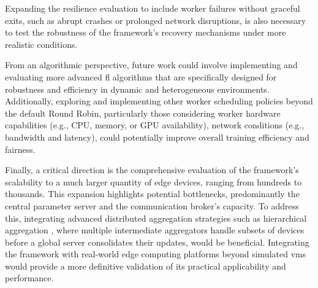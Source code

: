 Expanding the resilience evaluation to include worker failures without graceful exits, such as abrupt crashes or prolonged network disruptions, is also necessary to test the robustness of the framework's recovery mechanisms under more realistic conditions.

From an algorithmic perspective, future work could involve implementing and evaluating more advanced \ac{fl} algorithms that are specifically designed for robustness and efficiency in dynamic and heterogeneous environments. Additionally, exploring and implementing other worker scheduling policies beyond the default Round Robin, particularly those considering worker hardware capabilities (e.g., CPU, memory, or GPU availability), network conditions (e.g., bandwidth and latency), could potentially improve overall training efficiency and fairness.

Finally, a critical direction is the comprehensive evaluation of the framework's scalability to a much larger quantity of edge devices, ranging from hundreds to thousands. This expansion highlights potential bottlenecks, predominantly the central parameter server and the communication broker's capacity. To address this, integrating advanced distributed aggregation strategies such as hierarchical aggregation \cite{liu2022distributed}, where multiple intermediate aggregators handle subsets of devices before a global server consolidates their updates, would be beneficial. Integrating the framework with real-world edge computing platforms beyond simulated \acp{vm} would provide a more definitive validation of its practical applicability and performance.